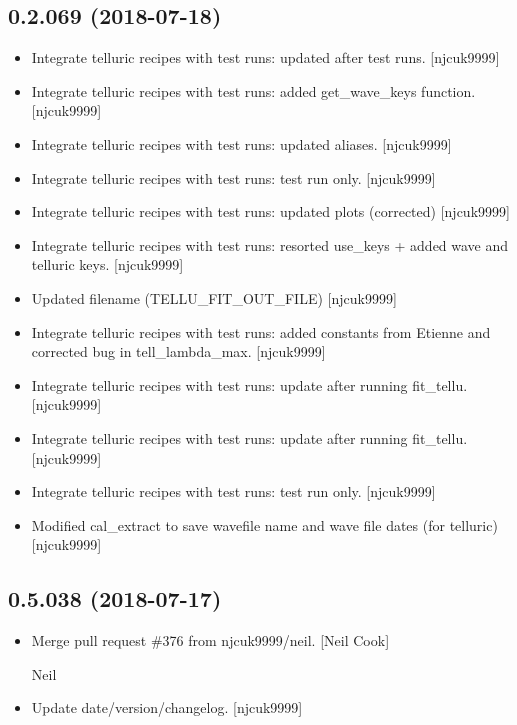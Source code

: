 \documentclass[a4paper,10pt,english]{report}
\begin{document}
\subsection{0.2.069 (2018-07-18)}
\label{\detokenize{misc/changelog:id387}}\begin{itemize}
\item {} 
Integrate telluric recipes with test runs: updated after test runs.
{[}njcuk9999{]}

\item {} 
Integrate telluric recipes with test runs: added get\_wave\_keys
function. {[}njcuk9999{]}

\item {} 
Integrate telluric recipes with test runs: updated aliases.
{[}njcuk9999{]}

\item {} 
Integrate telluric recipes with test runs: test run only. {[}njcuk9999{]}

\item {} 
Integrate telluric recipes with test runs: updated plots (corrected)
{[}njcuk9999{]}

\item {} 
Integrate telluric recipes with test runs: resorted use\_keys + added
wave and telluric keys. {[}njcuk9999{]}

\item {} 
Updated filename (TELLU\_FIT\_OUT\_FILE) {[}njcuk9999{]}

\item {} 
Integrate telluric recipes with test runs: added constants from
Etienne and corrected bug in tell\_lambda\_max. {[}njcuk9999{]}

\item {} 
Integrate telluric recipes with test runs: update after running
fit\_tellu. {[}njcuk9999{]}

\item {} 
Integrate telluric recipes with test runs: update after running
fit\_tellu. {[}njcuk9999{]}

\item {} 
Integrate telluric recipes with test runs: test run only. {[}njcuk9999{]}

\item {} 
Modified cal\_extract to save wavefile name and wave file dates (for
telluric) {[}njcuk9999{]}

\end{itemize}


\subsection{0.5.038 (2018-07-17)}
\label{\detokenize{misc/changelog:id388}}\begin{itemize}
\item {} 
Merge pull request \#376 from njcuk9999/neil. {[}Neil Cook{]}

Neil

\item {} 
Update date/version/changelog. {[}njcuk9999{]}

\end{itemize}
\end{document}
